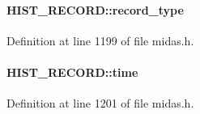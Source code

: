\paragraph[{record\_\-type}]{ {\bf HIST\_\-RECORD::record\_\-type}}\hfill\label{structHIST__RECORD_a455da5efe0b4d3844e387e440b86302d}


Definition at line 1199 of file midas.h.
\paragraph[{time}]{ {\bf HIST\_\-RECORD::time}}\hfill\label{structHIST__RECORD_a82235a34fe6b068c106c608b3893aff7}


Definition at line 1201 of file midas.h.